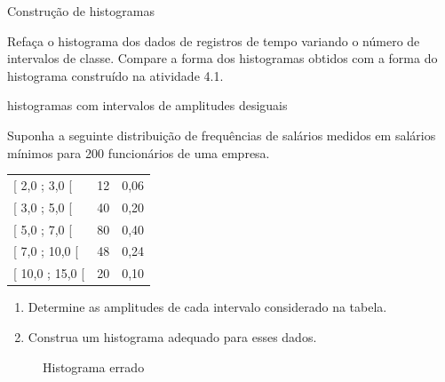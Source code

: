 \practice{ }
\label{\detokenize{PE103-5::doc}}\label{\detokenize{PE103-5:praticando}}\label{\detokenize{PE103-5:cap-praticando2}}\label{\detokenize{PE103-5:ativ-variacoes-do-histograma}}
\begin{task}{ Construção de histogramas}

Refaça o histograma dos dados de registros de tempo variando o número de intervalos de classe. Compare a forma dos histogramas obtidos com a forma do histograma construído na atividade 4.1.
\end{task}


\label{\detokenize{PE103-5:ativ-titulo-da-histogramas-intervalos-desiguais}}
\begin{task}{histogramas com intervalos de amplitudes desiguais}

Suponha a seguinte distribuição de frequências de salários medidos em salários mínimos para 200 funcionários de uma empresa.


\begin{savenotes}\sphinxattablestart
\centering
\begin{tabulary}{\linewidth}[t]{|T|T|T|}
\hline
{}\relax &\relax &\relax \\
\hline
{[} 2,0 ; 3,0 {[}
&
12
&
0,06
\\
\hline
{[} 3,0 ; 5,0 {[}
&
40
&
0,20
\\
\hline
{[} 5,0 ; 7,0 {[}
&
80
&
0,40
\\
\hline
{[} 7,0 ; 10,0 {[}
&
48
&
0,24
\\
\hline
{[} 10,0 ; 15,0 {[}
&
20
&
0,10
\\
\hline
\end{tabulary}
\par
\sphinxattableend\end{savenotes}
\begin{enumerate}
\item {} 
Determine as amplitudes de cada intervalo considerado na tabela.

\item {} 
Construa um histograma adequado para esses dados.

\end{enumerate}
\end{task}



\begin{figure}[H]
\centering
\capstart

\noindent{}
\caption{Histograma errado}\label{\detokenize{PE103-5:id5}}\label{\detokenize{PE103-5:id11}}\end{figure}

